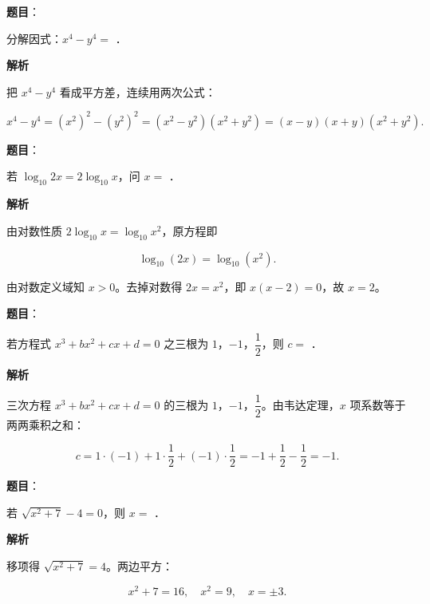 
\begin{answer}

\textbf{题目}：

分解因式：$x^4-y^4=$ \gkblank{}．

\textbf{解析}

把 $x^4-y^4$ 看成平方差，连续用两次公式：

\nopagebreak[4]
\[
x^4-y^4=(x^2)^2-(y^2)^2=(x^2-y^2)(x^2+y^2)=(x-y)(x+y)(x^2+y^2).
\]


\end{answer}
\begin{answer}

\textbf{题目}：

若 $\log_{10}2x=2\log_{10}x$，问 $x=$ \gkblank{}．

\textbf{解析}

由对数性质 $2\log_{10}x=\log_{10}x^2$，原方程即

\nopagebreak[4]
\[
\log_{10}(2x)=\log_{10}(x^2).
\]

由对数定义域知 $x>0$。去掉对数得 $2x=x^2$，即 $x(x-2)=0$，故 $x=2$。


\end{answer}
\begin{answer}

\textbf{题目}：

若方程式 $x^3+bx^2+cx+d=0$ 之三根为 $1$，$-1$，$\dfrac12$，则 $c=$ \gkblank{}．

\textbf{解析}

三次方程 $x^3+bx^2+cx+d=0$ 的三根为 $1$，$-1$，$\dfrac12$。由韦达定理，$x$ 项系数等于两两乘积之和：

\nopagebreak[4]
\[
c=1\cdot(-1)+1\cdot\dfrac12+(-1)\cdot\dfrac12=-1+\dfrac12-\dfrac12=-1.
\]


\end{answer}
\begin{answer}

\textbf{题目}：

若 $\sqrt{x^2+7}-4=0$，则 $x=$ \gkblank{}．

\textbf{解析}

移项得 $\sqrt{x^2+7}=4$。两边平方：

\nopagebreak[4]
\[
x^2+7=16,\quad x^2=9,\quad x=\pm3.
\]


\end{answer}

